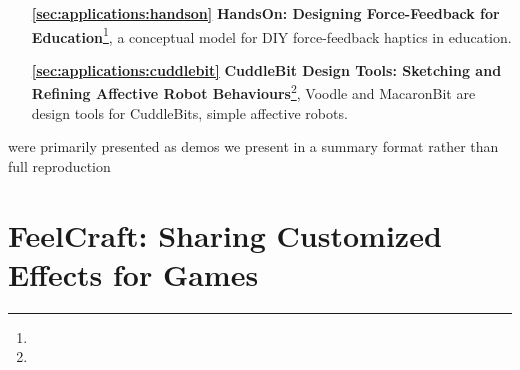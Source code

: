 \begin{enumerate}
    \item[\bf\ref{sec:applications:handson}]
    \textbf{HandsOn: Designing Force-Feedback for Education}\footnote{}, a conceptual model for DIY force-feedback haptics in education. 
    
    \item[\bf\ref{sec:applications:cuddlebit}]
    \textbf{CuddleBit Design Tools: Sketching and Refining Affective Robot Behaviours}\footnote{}, Voodle and MacaronBit are design tools for CuddleBits, simple affective robots.
\end{enumerate}


\noindent
{}\revRG{)}  were primarily presented as demos we present  in a summary format rather than full reproduction

\section{FeelCraft: Sharing Customized Effects for Games}
\label{sec:applications:feelcraft}

